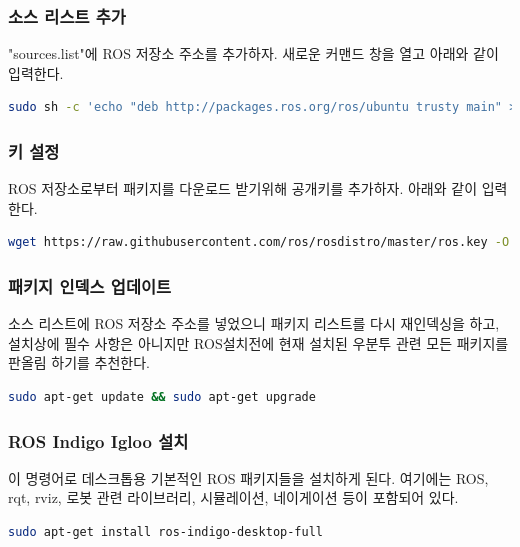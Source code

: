 \subsubsection{소스 리스트 추가}
"sources.list"에 ROS 저장소 주소를 추가하자. 새로운 커맨드 창을 열고 아래와 같이 입력한다. 

\begin{lstlisting}[language=bash]
sudo sh -c 'echo "deb http://packages.ros.org/ros/ubuntu trusty main" > /etc/apt/sources.list.d/ros-latest.list'
\end{lstlisting}

\subsubsection{키 설정}
ROS 저장소로부터 패키지를 다운로드 받기위해 공개키를 추가하자. 아래와 같이 입력한다.

\begin{lstlisting}[language=bash]
wget https://raw.githubusercontent.com/ros/rosdistro/master/ros.key -O - | sudo apt-key add -
\end{lstlisting}

\subsubsection{패키지 인덱스 업데이트}
소스 리스트에 ROS 저장소 주소를 넣었으니 패키지 리스트를 다시 재인덱싱을 하고, 설치상에 필수 사항은 아니지만 ROS설치전에 현재 설치된 우분투 관련 모든 패키지를 판올림 하기를 추천한다.

\begin{lstlisting}[language=bash]
sudo apt-get update && sudo apt-get upgrade
\end{lstlisting}

\subsubsection{ROS Indigo Igloo 설치}
이 명령어로 데스크톱용 기본적인 ROS 패키지들을 설치하게 된다. 여기에는 ROS, rqt, rviz, 로봇 관련 라이브러리, 시뮬레이션, 네이게이션 등이 포함되어 있다.

\begin{lstlisting}[language=bash]
sudo apt-get install ros-indigo-desktop-full
\end{lstlisting}

